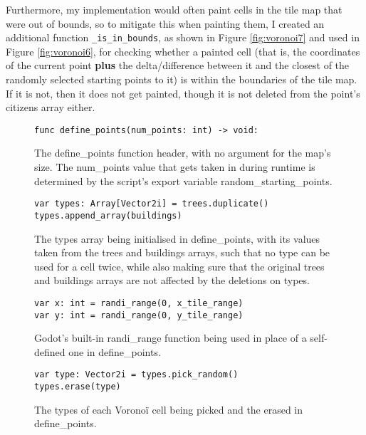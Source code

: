 Furthermore, my implementation would often paint cells in the tile map that were out of bounds, so to mitigate this when painting them, I created an additional function \verb|_is_in_bounds|, as shown in Figure \ref{fig:voronoi7} and used in Figure \ref{fig:voronoi6}, for checking whether a painted cell (that is, the coordinates of the current point \textbf{plus} the delta/difference between it and the closest of the randomly selected starting points to it) is within the boundaries of the tile map. If it is not, then it does not get painted, though it is not deleted from the point's citizens array either.

\begin{figure}[H]
    \centering
    \begin{lstlisting}
func define_points(num_points: int) -> void:
    \end{lstlisting}
    \caption{The define\_points function header, with no argument for the map's size. The num\_points value that gets taken in during runtime is determined by the script's export variable random\_starting\_points.}
    \label{fig:voronoi1}
\end{figure}

\begin{figure}[H]
    \centering
    \begin{lstlisting}
var types: Array[Vector2i] = trees.duplicate()
types.append_array(buildings)
    \end{lstlisting}
    \caption{The types array being initialised in define\_points, with its values taken from the trees and buildings arrays, such that no type can be used for a cell twice, while also making sure that the original trees and buildings arrays are not affected by the deletions on types.}
    \label{fig:voronoi2}
\end{figure}

\begin{figure}[H]
    \centering
    \begin{lstlisting}
var x: int = randi_range(0, x_tile_range)
var y: int = randi_range(0, y_tile_range)
    \end{lstlisting}
    \caption{Godot's built-in randi\_range function being used in place of a self-defined one in define\_points.}
    \label{fig:voronoi3}
\end{figure}

\begin{figure}[H]
    \centering
    \begin{lstlisting}
var type: Vector2i = types.pick_random()
types.erase(type)
    \end{lstlisting}
    \caption{The types of each Voronoï cell being picked and the erased in define\_points.}
    \label{fig:voronoi4}
\end{figure}

